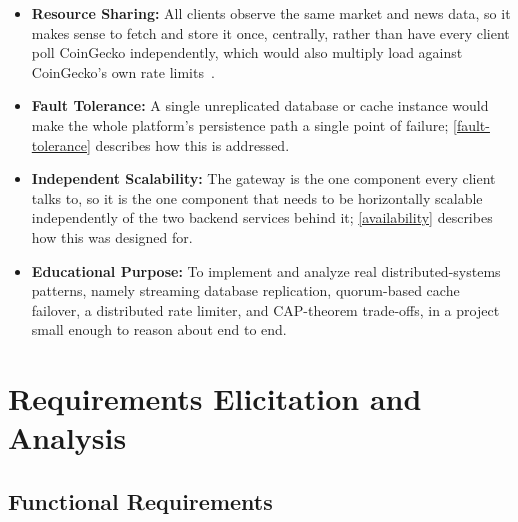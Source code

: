 \documentclass{scrartcl}
\begin{document}
\begin{itemize}
  \item \textbf{Resource Sharing:} All clients observe the same market and news data, so it makes
  sense to fetch and store it once, centrally, rather than have every client poll CoinGecko
  independently, which would also multiply load against CoinGecko's own rate
  limits~\citep{coingecko2024api}.
  \item \textbf{Fault Tolerance:} A single unreplicated database or cache instance would make the
  whole platform's persistence path a single point of failure; \cref{fault-tolerance} describes
  how this is addressed.
  \item \textbf{Independent Scalability:} The gateway is the one component every client talks to,
  so it is the one component that needs to be horizontally scalable independently of the two
  backend services behind it; \cref{availability} describes how this was designed for.
  \item \textbf{Educational Purpose:} To implement and analyze real distributed-systems patterns,
  namely streaming database replication, quorum-based cache failover, a distributed rate limiter,
  and CAP-theorem trade-offs, in a project small enough to reason about end to end.
\end{itemize}

\section{Requirements Elicitation and Analysis}\label{requirements}

\subsection{Functional Requirements}\label{functional-requirements}
\end{document}
